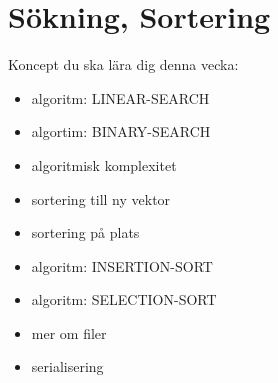 \chapter{Sökning, Sortering}\label{chapter:W10}
Koncept du ska lära dig denna vecka:
\begin{multicols}{2}\begin{itemize}[nosep,label={$\square$},leftmargin=*]
\item algoritm: LINEAR-SEARCH
\item algortim: BINARY-SEARCH
\item algoritmisk komplexitet
\item sortering till ny vektor
\item sortering på plats
\item algoritm: INSERTION-SORT
\item algoritm: SELECTION-SORT
\item mer om filer
\item serialisering\end{itemize}\end{multicols}
